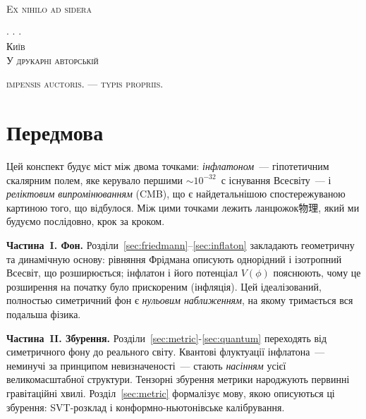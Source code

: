 \documentclass[12pt, a4paper, openany]{book}
\begin{document}
\begin{titlepage}
\vfill

{\scshape\small Ex nihilo ad sidera}

\vspace{0.3cm}

{\large $\cdot$ \hrulefill $\cdot$ \hrulefill $\cdot$} \\[0.2cm]

{\scshape Київ} \\[0.1cm]
{\scshape У друкарні авторській} \\[0.1cm]
{\small \scshape \uppercase\expandafter{\romannumeral\year}}

\vspace{0.8cm}

{\tiny \textsc{impensis auctoris. — typis propriis.}}

\end{titlepage}
\clearpage

\tableofcontents
\pagestyle{plain}

\chapter*{Передмова}

Цей конспект будує міст між двома точками: \emph{інфлатоном}~---
гіпотетичним скалярним полем, яке керувало першими
${\sim}10^{-32}$~с існування Всесвіту~--- і \emph{реліктовим випромінюванням} (CMB),
що є найдетальнішою спостережуваною картиною того, що відбулося.
Між цими точками лежить ланцюжок物理, який ми будуємо
послідовно, крок за кроком.

\textbf{Частина~I. Фон.} Розділи~\ref{sec:friedmann}–\ref{sec:inflaton}
закладають геометричну та динамічную основу: рівняння Фрідмана описують
однорідний і ізотропний Всесвіт, що розширюється; інфлатон і його
потенціал $V(\phi)$ пояснюють, чому це розширення на початку було
прискореним (інфляція). Цей ідеалізований, полностью симетричний фон є
\emph{нульовим наближенням}, на якому тримається вся подальша фізика.

\textbf{Частина~II. Збурення.} Розділи~\ref{sec:metric}-\ref{sec:quantum}
переходять від симетричного фону до реального світу. Квантові флуктуації
інфлатона~--- неминучі за принципом невизначеності~--- стають
\emph{насінням} усієї великомасштабної структури. Тензорні збурення
метрики народжують первинні гравітаційні хвилі. Розділ~\ref{sec:metric}
формалізує мову, якою описуються ці збурення: SVT-розклад і
конформно-ньютонівське калібрування.
\end{document}
